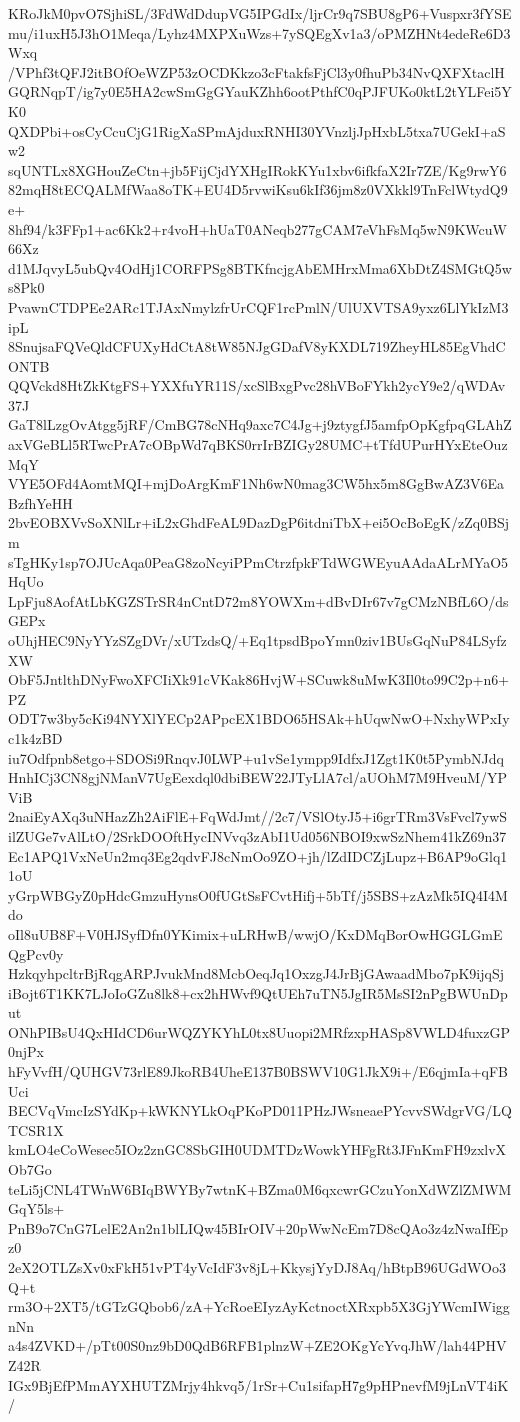 KRoJkM0pvO7SjhiSL/3FdWdDdupVG5IPGdIx/ljrCr9q7SBU8gP6+Vuspxr3fYSE
mu/i1uxH5J3hO1Meqa/Lyhz4MXPXuWzs+7ySQEgXv1a3/oPMZHNt4edeRe6D3Wxq
/VPhf3tQFJ2itBOfOeWZP53zOCDKkzo3cFtakfsFjCl3y0fhuPb34NvQXFXtaclH
GQRNqpT/ig7y0E5HA2cwSmGgGYauKZhh6ootPthfC0qPJFUKo0ktL2tYLFei5YK0
QXDPbi+osCyCcuCjG1RigXaSPmAjduxRNHI30YVnzljJpHxbL5txa7UGekI+aSw2
sqUNTLx8XGHouZeCtn+jb5FijCjdYXHgIRokKYu1xbv6ifkfaX2Ir7ZE/Kg9rwY6
82mqH8tECQALMfWaa8oTK+EU4D5rvwiKsu6kIf36jm8z0VXkkl9TnFclWtydQ9e+
8hf94/k3FFp1+ac6Kk2+r4voH+hUaT0ANeqb277gCAM7eVhFsMq5wN9KWcuW66Xz
d1MJqvyL5ubQv4OdHj1CORFPSg8BTKfncjgAbEMHrxMma6XbDtZ4SMGtQ5ws8Pk0
PvawnCTDPEe2ARc1TJAxNmylzfrUrCQF1rcPmlN/UlUXVTSA9yxz6LlYkIzM3ipL
8SnujsaFQVeQldCFUXyHdCtA8tW85NJgGDafV8yKXDL719ZheyHL85EgVhdCONTB
QQVckd8HtZkKtgFS+YXXfuYR11S/xcSlBxgPvc28hVBoFYkh2ycY9e2/qWDAv37J
GaT8lLzgOvAtgg5jRF/CmBG78cNHq9axc7C4Jg+j9ztygfJ5amfpOpKgfpqGLAhZ
axVGeBLl5RTwcPrA7cOBpWd7qBKS0rrIrBZIGy28UMC+tTfdUPurHYxEteOuzMqY
VYE5OFd4AomtMQI+mjDoArgKmF1Nh6wN0mag3CW5hx5m8GgBwAZ3V6EaBzfhYeHH
2bvEOBXVvSoXNlLr+iL2xGhdFeAL9DazDgP6itdniTbX+ei5OcBoEgK/zZq0BSjm
sTgHKy1sp7OJUcAqa0PeaG8zoNcyiPPmCtrzfpkFTdWGWEyuAAdaALrMYaO5HqUo
LpFju8AofAtLbKGZSTrSR4nCntD72m8YOWXm+dBvDIr67v7gCMzNBfL6O/dsGEPx
oUhjHEC9NyYYzSZgDVr/xUTzdsQ/+Eq1tpsdBpoYmn0ziv1BUsGqNuP84LSyfzXW
ObF5JntlthDNyFwoXFCIiXk91cVKak86HvjW+SCuwk8uMwK3Il0to99C2p+n6+PZ
ODT7w3by5cKi94NYXlYECp2APpcEX1BDO65HSAk+hUqwNwO+NxhyWPxIyc1k4zBD
iu7Odfpnb8etgo+SDOSi9RnqvJ0LWP+u1vSe1ympp9IdfxJ1Zgt1K0t5PymbNJdq
HnhICj3CN8gjNManV7UgEexdql0dbiBEW22JTyLlA7cl/aUOhM7M9HveuM/YPViB
2naiEyAXq3uNHazZh2AiFlE+FqWdJmt//2c7/VSlOtyJ5+i6grTRm3VsFvcl7ywS
ilZUGe7vAlLtO/2SrkDOOftHycINVvq3zAbI1Ud056NBOI9xwSzNhem41kZ69n37
Ec1APQ1VxNeUn2mq3Eg2qdvFJ8cNmOo9ZO+jh/lZdIDCZjLupz+B6AP9oGlq11oU
yGrpWBGyZ0pHdcGmzuHynsO0fUGtSsFCvtHifj+5bTf/j5SBS+zAzMk5IQ4I4Mdo
oIl8uUB8F+V0HJSyfDfn0YKimix+uLRHwB/wwjO/KxDMqBorOwHGGLGmEQgPcv0y
HzkqyhpcltrBjRqgARPJvukMnd8McbOeqJq1OxzgJ4JrBjGAwaadMbo7pK9ijqSj
iBojt6T1KK7LJoIoGZu8lk8+cx2hHWvf9QtUEh7uTN5JgIR5MsSI2nPgBWUnDput
ONhPIBsU4QxHIdCD6urWQZYKYhL0tx8Uuopi2MRfzxpHASp8VWLD4fuxzGP0njPx
hFyVvfH/QUHGV73rlE89JkoRB4UheE137B0BSWV10G1JkX9i+/E6qjmIa+qFBUci
BECVqVmcIzSYdKp+kWKNYLkOqPKoPD011PHzJWsneaePYcvvSWdgrVG/LQTCSR1X
kmLO4eCoWesec5IOz2znGC8SbGIH0UDMTDzWowkYHFgRt3JFnKmFH9zxlvXOb7Go
teLi5jCNL4TWnW6BIqBWYBy7wtnK+BZma0M6qxcwrGCzuYonXdWZlZMWMGqY5ls+
PnB9o7CnG7LelE2An2n1blLIQw45BIrOIV+20pWwNcEm7D8cQAo3z4zNwaIfEpz0
2eX2OTLZsXv0xFkH51vPT4yVcIdF3v8jL+KkysjYyDJ8Aq/hBtpB96UGdWOo3Q+t
rm3O+2XT5/tGTzGQbob6/zA+YcRoeEIyzAyKctnoctXRxpb5X3GjYWcmIWiggnNn
a4s4ZVKD+/pTt00S0nz9bD0QdB6RFB1plnzW+ZE2OKgYcYvqJhW/lah44PHVZ42R
IGx9BjEfPMmAYXHUTZMrjy4hkvq5/1rSr+Cu1sifapH7g9pHPnevfM9jLnVT4iK/
